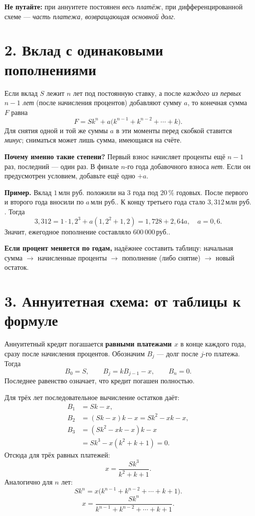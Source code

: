 \documentclass[a4paper,12pt]{article}
\newcommand{\key}[1]{\textcolor{darkaccent}{\textbf{#1}}}
\newcommand{\rub}{\,\text{руб.}}
\newcommand{\mln}{\,\text{млн руб.}}
\newcommand{\fboxeq}[1]{\[\boxed{#1}\]}
\newcommand{\pct}{\,\%}
\begin{document}
\key{Не путайте:} при аннуитете постоянен \emph{весь платёж}, при дифференцированной схеме --- \emph{часть платежа, возвращающая основной долг}.

\section*{2. Вклад с одинаковыми пополнениями}

Если вклад $S$ лежит $n$ лет под постоянную ставку, а после \emph{каждого из первых $n-1$ лет} (после начисления процентов) добавляют сумму $a$, то конечная сумма $F$ равна
\fboxeq{F=Sk^n+a\bigl(k^{n-1}+k^{n-2}+\cdots+k\bigr).}
Для снятия одной и той же суммы $a$ в эти моменты перед скобкой ставится \emph{минус}; сниматься может лишь сумма, имеющаяся на счёте.

\textbf{Почему именно такие степени?} Первый взнос начисляет проценты ещё $n-1$ раз, последний --- один раз. В финале $n$-го года добавочного взноса \emph{нет}. Если он предусмотрен условием, добавьте ещё одно $+a$.

\textbf{Пример.} Вклад $1\mln$ положили на $3$ года под $20\pct$ годовых. После первого и второго года вносили по $a\mln$. К концу третьего года стало $3{,}312\mln$. Тогда
\[
3{,}312=1\cdot1{,}2^3+a(1{,}2^2+1{,}2)
=1{,}728+2{,}64a,
\quad a=0{,}6.
\]
Значит, ежегодное пополнение составляло $600\,000\rub$.

\key{Если процент меняется по годам,} надёжнее составить таблицу: начальная сумма $\to$ начисленные проценты $\to$ пополнение (либо снятие) $\to$ новый остаток.

\clearpage
\section*{3. Аннуитетная схема: от таблицы к формуле}

Аннуитетный кредит погашается \key{равными платежами $x$} в конце каждого года, сразу после начисления процентов. Обозначим $B_j$ --- долг после $j$-го платежа. Тогда
\[
B_0=S,\qquad B_j=kB_{j-1}-x,\qquad B_n=0.
\]
Последнее равенство означает, что кредит погашен полностью.

Для трёх лет последовательное вычисление остатков даёт:
\[
\begin{aligned}
B_1&=Sk-x,\\
B_2&=(Sk-x)k-x=Sk^2-xk-x,\\
B_3&=(Sk^2-xk-x)k-x\\
   &=Sk^3-x(k^2+k+1)=0.
\end{aligned}
\]
Отсюда для трёх равных платежей:
\fboxeq{x=\frac{Sk^3}{k^2+k+1}.}
Аналогично для $n$ лет:
\fboxeq{Sk^n=x\bigl(k^{n-1}+k^{n-2}+\cdots+k+1\bigr).}
\fboxeq{x=\frac{Sk^n}{k^{n-1}+k^{n-2}+\cdots+k+1}.}
\end{document}
